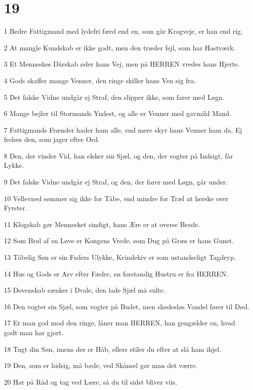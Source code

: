 \chapter{19}

\par 1 Bedre Fattigmand med lydefri færd end en, som går Krogveje, er han end rig.
\par 2 At mangle Kundskab er ikke godt, men den træder fejl, som har Hastværk.
\par 3 Et Menneskes Dårskab øder hans Vej, men på HERREN vredes hans Hjerte.
\par 4 Gods skaffer mange Venner, den ringe skiller hans Ven sig fra.
\par 5 Det falske Vidne undgår ej Straf; den slipper ikke, som farer med Løgn.
\par 6 Mange bejler til Stormands Yndest, og alle er Venner med gavmild Mand.
\par 7 Fattigmands Frænder hader ham alle, end mere skyr hans Venner ham da. Ej frelses den, som jager efter Ord.
\par 8 Den, der vinder Vid, han elsker sin Sjæl, og den, der vogter på Indsigt, får Lykke.
\par 9 Det falske Vidne undgår ej Straf, og den, der farer med Løgn, går under.
\par 10 Vellevned sømmer sig ikke for Tåbe, end mindre for Træl at herske over Fyrster.
\par 11 Klogskab gør Mennesket sindigt, hans Ære er at overse Brøde.
\par 12 Som Brøl af en Løve er Kongens Vrede, som Dug på Græs er hans Gunst.
\par 13 Tåbelig Søn er sin Faders Ulykke, Kvindekiv er som ustandseligt Tagdryp.
\par 14 Hus og Gods er Arv efter Fædre, en forstandig Hustru er fra HERREN.
\par 15 Dovenskab sænker i Dvale, den lade Sjæl må sulte.
\par 16 Den vogter sin Sjæl, som vogter på Budet, men skødesløs Vandel fører til Død.
\par 17 Er man god mod den ringe, låner man HERREN, han gengælder en, hvad godt man har gjort.
\par 18 Tugt din Søn, imens der er Håb, ellers stiler du efter at slå ham ihjel.
\par 19 Den, som er hidsig, må bøde, ved Skånsel gør man det værre.
\par 20 Hør på Råd og tag ved Lære, så du til sidst bliver viis.
